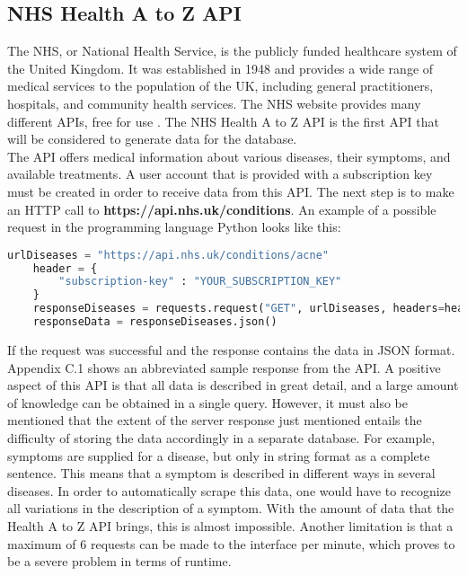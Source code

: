 \subsection{NHS Health A to Z API}
The NHS, or National Health Service, is the publicly funded healthcare system of the United Kingdom. It was established in 1948 and provides a wide range of medical services to the population of the UK, including general practitioners, hospitals, and community health services. The NHS website provides many different APIs, free for use \cite{.nhs}. The NHS Health A to Z API is the first API that will be considered to generate data for the database.
\newline \\
The API offers medical information about various diseases, their symptoms, and available treatments. A user account that is provided with a subscription key must be created in order to receive data from this API. The next step is to make an HTTP call to \textbf{https://api.nhs.uk/conditions}. An example of a possible request in the programming language Python looks like this:
\begin{lstlisting}[language=Python, caption={Example Python Request for the Health A to Z API}]
	urlDiseases = "https://api.nhs.uk/conditions/acne"
	header = {
		"subscription-key" : "YOUR_SUBSCRIPTION_KEY"
	}
	responseDiseases = requests.request("GET", urlDiseases, headers=header)
	responseData = responseDiseases.json()
\end{lstlisting}
If the request was successful and the response contains the data in JSON format. Appendix C.1 shows an abbreviated sample response from the API. A positive aspect of this API is that all data is described in great detail, and a large amount of knowledge can be obtained in a single query. However, it must also be mentioned that the extent of the server response just mentioned entails the difficulty of storing the data accordingly in a separate database. For example, symptoms are supplied for a disease, but only in string format as a complete sentence. This means that a symptom is described in different ways in several diseases. In order to automatically scrape this data, one would have to recognize all variations in the description of a symptom. With the amount of data that the Health A to Z API brings, this is almost impossible. Another limitation is that a maximum of 6 requests can be made to the interface per minute, which proves to be a severe problem in terms of runtime.

